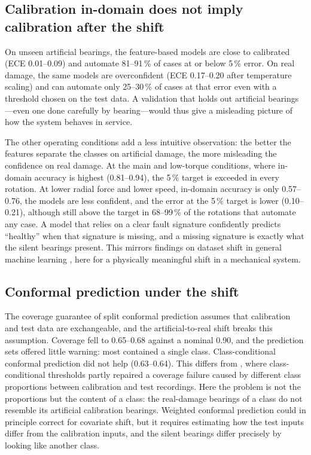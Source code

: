 \subsection{Calibration in-domain does not imply calibration after the shift}

On unseen artificial bearings, the feature-based models are close to calibrated (ECE 0.01--0.09) and automate 81--91\,\% of cases
at or below 5\,\% error. On real damage, the same models are overconfident (ECE 0.17--0.20 after temperature scaling) and
can automate only 25--30\,\% of cases at that error even with a threshold chosen on the test data. A validation that
holds out artificial bearings---even one done carefully by bearing---would thus give a misleading picture of how the
system behaves in service.

The other operating conditions add a less intuitive observation: the better the features separate the classes on
artificial damage, the more misleading the confidence on real damage. At the main and low-torque conditions, where
in-domain accuracy is highest (0.81--0.94), the 5\,\% target is exceeded in every rotation. At lower radial force and
lower speed, in-domain accuracy is only 0.57--0.76, the models are less confident, and the error at the 5\,\% target
is lower (0.10--0.21), although still above the target in 68--99\,\% of the rotations that automate any case. A model that relies on a clear
fault signature confidently predicts ``healthy'' when that signature is missing, and a missing signature is exactly what
the silent bearings present. This mirrors findings on dataset shift in general machine learning \citep{ovadia2019},
here for a physically meaningful shift in a mechanical system.

\subsection{Conformal prediction under the shift}

The coverage guarantee of split conformal prediction assumes that calibration and test data are exchangeable, and the
artificial-to-real shift breaks this assumption. Coverage fell to 0.65--0.68 against a nominal 0.90, and the
prediction sets offered little warning: most contained a single class. Class-conditional conformal prediction did not
help (0.63--0.64). This differs from \citet{gonzalezgarcia2026}, where class-conditional thresholds partly repaired a
coverage failure caused by different class proportions between calibration and test recordings. Here the problem is
not the proportions but the content of a class: the real-damage bearings of a class do not resemble its artificial
calibration bearings. Weighted conformal prediction \citep{tibshirani2019} could in principle correct for covariate
shift, but it requires estimating how the test inputs differ from the calibration inputs, and the silent bearings
differ precisely by looking like another class.

